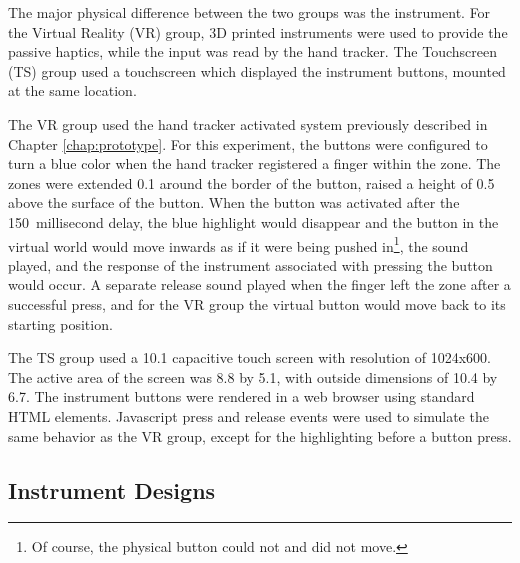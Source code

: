 The major physical difference between the two groups was the instrument.
For the Virtual Reality (VR) group, 3D printed instruments were used to provide the passive haptics, while the input was read by the hand tracker.
The Touchscreen (TS) group used a touchscreen which displayed the instrument buttons, mounted at the same location.

The VR group used the hand tracker activated system previously described in Chapter \ref{chap:prototype}.
For this experiment, the buttons were configured to turn a blue color when the hand tracker registered a finger within the zone.
The zones were extended \SI{0.1}{\inch} around the border of the button, raised a height of \SI{0.5}{\inch} above the surface of the button.
When the button was activated after the 150~millisecond delay, the blue highlight would disappear and the button in the virtual world would move inwards as if it were being pushed in\footnote{Of course, the physical button could not and did not move.}, the sound played, and the response of the instrument associated with pressing the button would occur.
A separate release sound played when the finger left the zone after a successful press, and for the VR group the virtual button would move back to its starting position.

The TS group used a \SI{10.1}{\inch} capacitive touch screen with resolution of 1024x600.
The active area of the screen was \SI{8.8}{\inch} by \SI{5.1}{\inch}, with outside dimensions of \SI{10.4}{\inch} by \SI{6.7}{\inch}.
The instrument buttons were rendered in a web browser using standard HTML elements.
Javascript press and release events were used to simulate the same behavior as the VR group, except for the highlighting before a button press.

\subsection{Instrument Designs}

